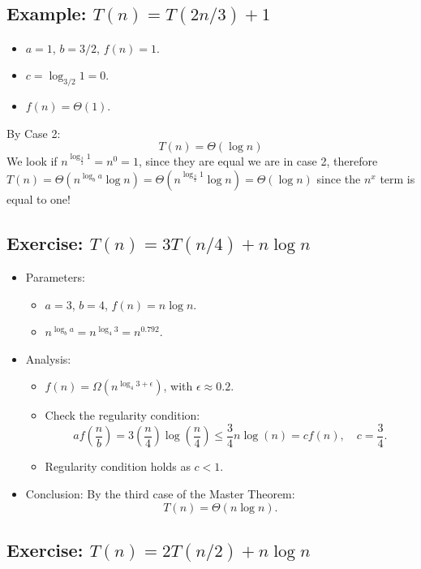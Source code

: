 \subsection{Example: \(T(n) = T(2n/3) + 1\)}
\begin{itemize}
    \item \(a = 1\), \(b = 3/2\), \(f(n) = 1\).
    \item \(c = \log_{3/2} 1 = 0\).
    \item \(f(n) = \Theta(1)\).
\end{itemize}
By Case 2:  
\[
T(n) = \Theta(\log n)
\]
We look if $n^{\log_{\frac{3}{2}} 1} = n^0 = 1$, since they are equal we are in case 2, therefore $T(n) = \Theta(n^{\log_b a} \log n) = \Theta(n^{\log_{\frac{3}{2}} 1} \log n) = \Theta(\log n)$ since the $n^x$ term is equal to one!

\subsection{Exercise: \(T(n) = 3T(n/4) + n \log n\)}

\begin{itemize}
    \item Parameters:
    \begin{itemize}
        \item \(a = 3\), \(b = 4\), \(f(n) = n \log n\).
        \item \(n^{\log_b a} = n^{\log_4 3} = n^{0.792}\).
    \end{itemize}
    \item Analysis:
    \begin{itemize}
        \item \(f(n) = \Omega(n^{\log_4 3 + \epsilon})\), with \(\epsilon \approx 0.2\).
        \item Check the regularity condition:
        \[
        af\left(\frac{n}{b}\right) = 3 \left(\frac{n}{4}\right) \log\left(\frac{n}{4}\right) \leq \frac{3}{4}n \log(n) = cf(n), \quad c = \frac{3}{4}.
        \]
        \item Regularity condition holds as \(c < 1\).
    \end{itemize}
    \item Conclusion: By the third case of the Master Theorem:
    \[
    T(n) = \Theta(n \log n).
    \]
\end{itemize}

\subsection{Exercise: \(T(n) = 2T(n/2) + n \log n\)}

